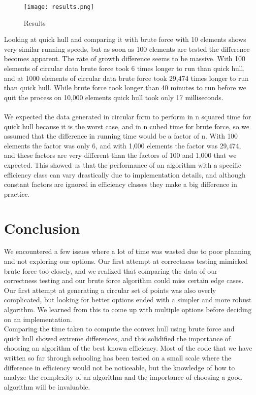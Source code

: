 \documentclass[a4paper, 12pt]{article}
\begin{document}
{  \begin{figure}[H]
    \begin{center}
    \texttt{[image: results.png]}
  \end{center}
    \caption{Results}
    \label{fig:results}
  \end{figure} 
Looking at quick hull and comparing it with brute force with 10 elements shows very similar running
speeds, but as soon as 100 elements are tested the difference becomes apparent. The rate of growth
difference seems to be massive. With 100 elements of circular data brute force took 6 times longer to
run than quick hull, and at 1000 elements of circular data brute force took 29,474 times longer to run
than quick hull. While brute force took longer than 40 minutes to run before we quit the process on
10,000 elements quick hull took only 17 milliseconds.
\\\\
We expected the data generated in circular form to perform in n squared time for quick hull because it is
the worst case, and in n cubed time for brute force, so we assumed that the difference in running time
would be a factor of n. With 100 elements the factor was only 6, and with 1,000 elements the factor was
29,474, and these factors are very different than the factors of 100 and 1,000 that we expected. This
showed us that the performance of an algorithm with a specific efficiency class can vary drastically due
to implementation details, and although constant factors are ignored in efficiency classes they make a
big difference in practice.
\section{Conclusion}
We encountered a few issues where a lot of time was wasted due to poor planning and not exploring
our options. Our first attempt at correctness testing mimicked brute force too closely, and we realized
that comparing the data of our correctness testing and our brute force algorithm could miss certain
edge cases. Our first attempt at generating a circular set of points was also overly complicated, but
looking for better options ended with a simpler and more robust algorithm. We learned from this to
come up with multiple options before deciding on an implementation.
\\

Comparing the time taken to compute the convex hull using brute force and quick hull showed extreme
differences, and this solidified the importance of choosing an algorithm of the best known efficiency.
Most of the code that we have written so far through schooling has been tested on a small scale where
the difference in efficiency would not be noticeable, but the knowledge of how to analyze the
complexity of an algorithm and the importance of choosing a good algorithm will be invaluable.


}
\end{document}
